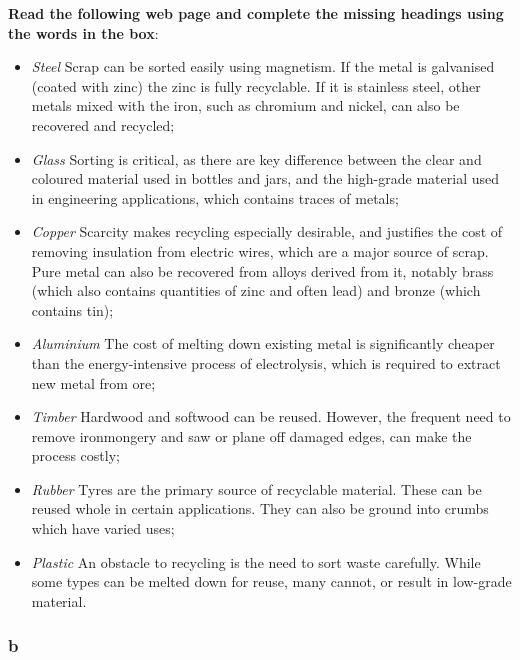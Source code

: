 \textbf{Read the following web page and complete the missing headings using the words in the box}:

\begin{itemize}

\item \textit{Steel} Scrap can be sorted easily using magnetism. If the metal is galvanised (coated with zinc) the zinc is fully recyclable. If it is stainless steel, other metals mixed with the iron, such as chromium and nickel, can also be recovered and recycled;

\item \textit{Glass} Sorting is critical, as there are key difference between the clear and coloured material used in bottles and jars, and the high-grade material used in engineering applications, which contains traces of metals;

\item \textit{Copper} Scarcity makes recycling especially desirable, and justifies the cost of removing insulation from electric wires, which are a major source of scrap. Pure metal can also be recovered from alloys derived from it, notably brass (which also contains quantities of zinc and often lead) and bronze (which contains tin);

\item \textit{Aluminium} The cost of melting down existing metal is significantly cheaper than the energy-intensive process of electrolysis, which is required to extract new metal from ore;

\item \textit{Timber} Hardwood and softwood can be reused. However, the frequent need to remove ironmongery and saw or plane off damaged edges, can make the process costly;

\item \textit{Rubber} Tyres are the primary source of recyclable material. These can be reused whole in certain applications. They can also be ground into crumbs which have varied uses;

\item \textit{Plastic} An obstacle to recycling is the need to sort waste carefully. While some types can be melted down for reuse, many cannot, or result in low-grade material.

\end{itemize}

\subsubsection{b}

